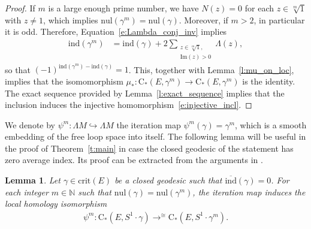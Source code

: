 \documentclass[reqno]{amsart}
\numberwithin{equation}{section}
\theoremstyle{personal}%
\newtheorem{lem}[thm]{Lemma}
\theoremstyle{definition}
\newcommand{\N}{\mathds{N}}
\newcommand{\crit}{\mathrm{crit}}
\newcommand{\Loc}{\mathrm{C}}
\newcommand{\avind}{\overline{\ind}}
\newcommand{\ind}{\mathrm{ind}}
\newcommand{\nul}{\mathrm{nul}}
\DeclareMathOperator*{\toup}{\longrightarrow}
\begin{document}
\begin{proof}
If $m$ is a large enough prime number, we have $N(z)=0$ for each $z\in \sqrt[m]{1}$ with $z\neq1$, which implies 
 $\nul(\gamma^m)=\nul(\gamma)$.
Moreover, if $m>2$, in particular it is odd. Therefore, Equation~\eqref{e:Lambda_conj_inv} implies
\begin{align*}
\ind(\gamma^m) & = \ind(\gamma) + 2\!\!\!\sum_{\textstyle
  \substack{    z\in\!\sqrt[m]{1},\\
    \mathrm{Im}(z)>0 }
} \Lambda(z),
\end{align*}
so that $(-1)^{\ind(\gamma^m)-\ind(\gamma)}=1$. This,  together with Lemma~\ref{l:mu_on_loc}, implies that the isomomorphism $\mu_*:\Loc_*(E,\gamma^m)\to\Loc_*(E,\gamma^m)$ is the identity. The exact sequence provided by Lemma~\ref{l:exact_sequence} implies that the inclusion induces the injective homomorphism~\eqref{e:injective_incl}.
\end{proof}



We denote by $\psi^m:\Lambda M\hookrightarrow\Lambda M$ the iteration map $\psi^m(\gamma)=\gamma^m$, which is a smooth embedding of the free loop space into itself. The following lemma will be useful in the proof of Theorem~\ref{t:main} in case the closed geodesic of the statement has zero average index. Its proof can be extracted from the arguments in \cite{Gromoll:1969gh}.

\begin{lem}
\label{l:loc_isom_iteration}
Let $\gamma\in\crit(E)$ be a closed geodesic such that $\avind(\gamma)=0$. For each integer $m\in\N$ such that $\nul(\gamma)=\nul(\gamma^m)$, the iteration map induces the local homology isomorphism
\begin{align*}
 \psi^m : \Loc_*(E,S^1\cdot\gamma) \toup^{\cong}\Loc_*(E,S^1\cdot\gamma^m).
\end{align*}
\end{lem}
\end{document}
